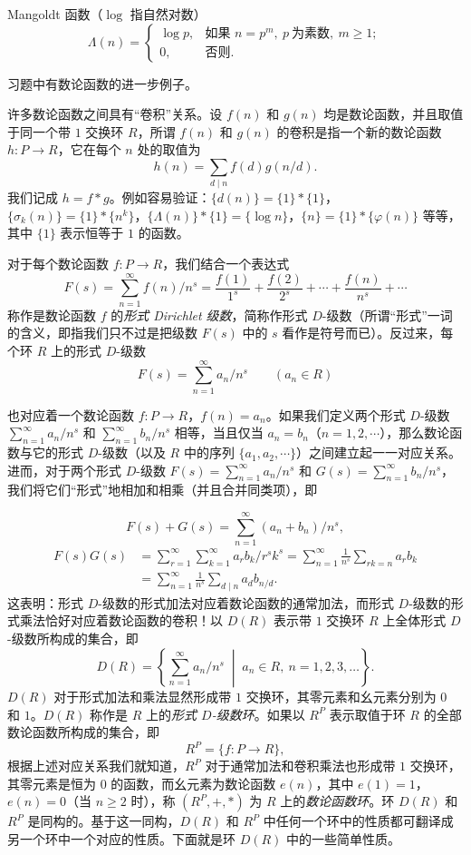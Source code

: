\begin{example}
Mangoldt 函数（$\log$ 指自然对数）
\[
  \Lambda(n)=\begin{cases}
    \log p, & \text{如果 } n=p^m,\ p\ \text{为素数},\ m\geqslant 1;\\
    0, & \text{否则}.
  \end{cases}
\]
\end{example}

习题中有数论函数的进一步例子。

\begin{sloppypar}
许多数论函数之间具有``卷积''关系。设 $f(n)$ 和 $g(n)$ 均是数论函数，并且取值于同一个带 $1$ 交换环 $R$，所谓 $f(n)$ 和 $g(n)$ 的卷积是指一个新的数论函数 $h\colon P\to R$，它在每个 $n$ 处的取值为
\[
  h(n)=\sum_{d\mid n}f(d)g(n/d).
\]
我们记成 $h=f*g$。例如容易验证：$\{d(n)\}=\{1\}*\{1\}$，$\{\sigma_k(n)\}=\{1\}*\{n^k\}$，$\{\Lambda(n)\}*\{1\}=\{\log n\}$，$\{n\}=\{1\}*\{\varphi(n)\}$ 等等，其中 $\{1\}$ 表示恒等于 $1$ 的函数。
\end{sloppypar}

对于每个数论函数 $f\colon P\to R$，我们结合一个表达式
\[
  F(s)=\sum_{n=1}^{\infty}f(n)/n^s
  =\frac{f(1)}{1^s}+\frac{f(2)}{2^s}+\cdots+\frac{f(n)}{n^s}+\cdots
\]
称作是数论函数 $f$ 的\emph{形式 Dirichlet 级数}，简称作形式 $D$-级数（所谓``形式''一词的含义，即指我们只不过是把级数 $F(s)$ 中的 $s$ 看作是符号而已）。反过来，每个环 $R$ 上的形式 $D$-级数
\[
  F(s)=\sum_{n=1}^{\infty}a_n/n^s\qquad(a_n\in R)
\]
\begin{sloppypar}
也对应着一个数论函数 $f\colon P\to R$，$f(n)=a_n$。如果我们定义两个形式 $D$-级数 $\sum_{n=1}^{\infty}a_n/n^s$ 和 $\sum_{n=1}^{\infty}b_n/n^s$ 相等，当且仅当 $a_n=b_n$（$n=1,2,\cdots$），那么数论函数与它的形式 $D$-级数（以及 $R$ 中的序列 $\{a_1,a_2,\cdots\}$）之间建立起一一对应关系。进而，对于两个形式 $D$-级数 $F(s)=\sum_{n=1}^{\infty}a_n/n^s$ 和 $G(s)=\sum_{n=1}^{\infty}b_n/n^s$，我们将它们``形式''地相加和相乘（并且合并同类项），即
\end{sloppypar}
\[
  F(s)+G(s)=\sum_{n=1}^{\infty}(a_n+b_n)/n^s,
\]
\begin{align*}
  F(s)G(s)&=\sum_{r=1}^{\infty}\sum_{k=1}^{\infty}a_rb_k/r^sk^s
  =\sum_{n=1}^{\infty}\frac{1}{n^s}\sum_{rk=n}a_rb_k\\
  &=\sum_{n=1}^{\infty}\frac{1}{n^s}\sum_{d\mid n}a_db_{n/d}.
\end{align*}
这表明：形式 $D$-级数的形式加法对应着数论函数的通常加法，而形式 $D$-级数的形式乘法恰好对应着数论函数的卷积！以 $D(R)$ 表示带 $1$ 交换环 $R$ 上全体形式 $D$-级数所构成的集合，即
\[
  D(R)=\left\{\sum_{n=1}^{\infty}a_n/n^s\;\middle|\;a_n\in R,\ n=1,2,3,\dots\right\}.
\]
$D(R)$ 对于形式加法和乘法显然形成带 $1$ 交换环，其零元素和幺元素分别为 $0$ 和 $1$。$D(R)$ 称作是 $R$ 上的\emph{形式 $D$-级数环}。如果以 $R^P$ 表示取值于环 $R$ 的全部数论函数所构成的集合，即
\[
  R^P=\{f\colon P\to R\},
\]
根据上述对应关系我们就知道，$R^P$ 对于通常加法和卷积乘法也形成带 $1$ 交换环，其零元素是恒为 $0$ 的函数，而幺元素为数论函数 $e(n)$，其中 $e(1)=1$，$e(n)=0$（当 $n\geqslant 2$ 时），称 $(R^P,+,*)$ 为 $R$ 上的\emph{数论函数环}。环 $D(R)$ 和 $R^P$ 是同构的。基于这一同构，$D(R)$ 和 $R^P$ 中任何一个环中的性质都可翻译成另一个环中一个对应的性质。下面就是环 $D(R)$ 中的一些简单性质。

